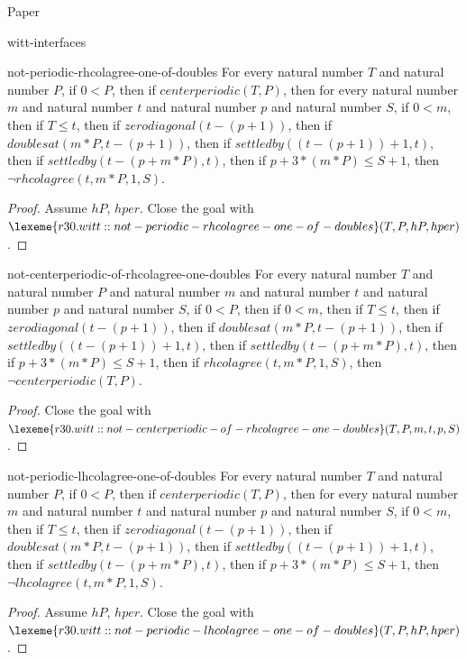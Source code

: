 \begin{lexlean}{Paper}
\begin{section}{witt-interfaces}
  \begin{theorem}{not-periodic-rhcolagree-one-of-doubles}
  For every natural number \(T\) and natural number \(P\), if \(0 < P\), then if \(centerperiodic(T, P)\), then for every natural number \(m\) and natural number \(t\) and natural number \(p\) and natural number \(S\), if \(0 < m\), then if \(T ≤ t\), then if \(zerodiagonal(t - (p + 1))\), then if \(doublesat(m * P, t - (p + 1))\), then if \(settledby((t - (p + 1)) + 1, t)\), then if \(settledby(t - (p + m * P), t)\), then if \(p + 3 * (m * P) ≤ S + 1\), then \(¬rhcolagree(t, m * P, 1, S)\).
  \begin{proof}
  Assume \(hP\), \(hper\).
  Close the goal with \(\lexeme{r30.witt::not-periodic-rhcolagree-one-of-doubles}(T, P, hP, hper)\).
  \end{proof}
  \end{theorem}

  \begin{theorem}{not-centerperiodic-of-rhcolagree-one-doubles}
  For every natural number \(T\) and natural number \(P\) and natural number \(m\) and natural number \(t\) and natural number \(p\) and natural number \(S\), if \(0 < P\), then if \(0 < m\), then if \(T ≤ t\), then if \(zerodiagonal(t - (p + 1))\), then if \(doublesat(m * P, t - (p + 1))\), then if \(settledby((t - (p + 1)) + 1, t)\), then if \(settledby(t - (p + m * P), t)\), then if \(p + 3 * (m * P) ≤ S + 1\), then if \(rhcolagree(t, m * P, 1, S)\), then \(¬centerperiodic(T, P)\).
  \begin{proof}
  Close the goal with \(\lexeme{r30.witt::not-centerperiodic-of-rhcolagree-one-doubles}(T, P, m, t, p, S)\).
  \end{proof}
  \end{theorem}

  \begin{theorem}{not-periodic-lhcolagree-one-of-doubles}
  For every natural number \(T\) and natural number \(P\), if \(0 < P\), then if \(centerperiodic(T, P)\), then for every natural number \(m\) and natural number \(t\) and natural number \(p\) and natural number \(S\), if \(0 < m\), then if \(T ≤ t\), then if \(zerodiagonal(t - (p + 1))\), then if \(doublesat(m * P, t - (p + 1))\), then if \(settledby((t - (p + 1)) + 1, t)\), then if \(settledby(t - (p + m * P), t)\), then if \(p + 3 * (m * P) ≤ S + 1\), then \(¬lhcolagree(t, m * P, 1, S)\).
  \begin{proof}
  Assume \(hP\), \(hper\).
  Close the goal with \(\lexeme{r30.witt::not-periodic-lhcolagree-one-of-doubles}(T, P, hP, hper)\).
  \end{proof}
  \end{theorem}


\end{section}
\end{lexlean}
